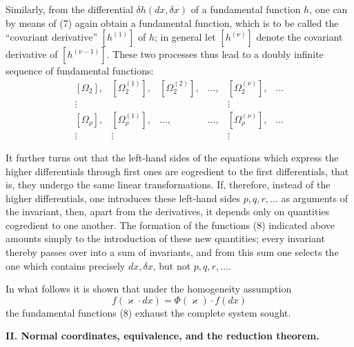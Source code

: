 \documentclass[11pt]{article}
\begin{document}
Similarly, from the differential \(\delta h(dx,\delta x)\) of a
fundamental function \(h\), one can by means of (7) again obtain a
fundamental function, which is to be called the ``covariant derivative''
\([h^{(1)}]\) of \(h\); in general let \([h^{(\nu)}]\) denote the
covariant derivative of \([h^{(\nu-1)}]\). These two processes thus lead
to a doubly infinite sequence of fundamental functions:
\begin{equation}
\begin{array}{cccccc}
[\Omega_2], & [\Omega_2^{(1)}], & [\Omega_2^{(2)}], & \ldots,
& [\Omega_2^{(\nu)}], & \ldots\\
\vdots &&&& \vdots&\\
{}[\Omega_\rho], & [\Omega_\rho^{(1)}], & \ldots, & \ldots,
& [\Omega_\rho^{(\nu)}], & \ldots\\
\vdots & \vdots &&& \vdots&
\end{array}
\tag{8}
\end{equation}

It further turns out that the left-hand sides of the equations which
express the higher differentials through first ones are cogredient to the
first differentials, that is, they undergo the same linear transformations.
If, therefore, instead of the higher differentials, one introduces these
left-hand sides \(p,q,r,\ldots\) as arguments of the invariant, then,
apart from the derivatives, it depends only on quantities cogredient to
one another. The formation of the functions (8) indicated above amounts
simply to the introduction of these new quantities; every invariant
thereby passes over into a sum of invariants, and from this sum one
selects the one which contains precisely \(dx,\delta x\), but not
\(p,q,r,\ldots\).

In what follows it is shown that under the homogeneity assumption
\[
f(\varkappa\cdot dx)=\Phi(\varkappa)\cdot f(dx)
\]
the fundamental functions (8) exhaust the complete system sought.

\begin{center}
\textbf{II. Normal coordinates, equivalence, and the reduction theorem.}
\end{center}
\end{document}
